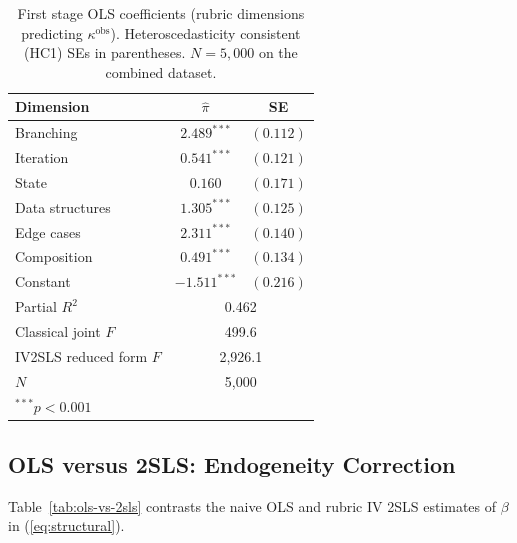 \documentclass{article}
\begin{document}
\begin{table}[h]
\centering
\caption{First stage OLS coefficients (rubric dimensions predicting $\kappa^{\text{obs}}$). Heteroscedasticity consistent (HC1) SEs in parentheses. $N=5{,}000$ on the combined dataset.}
\label{tab:stage1}
\begin{tabular}{@{}lcc@{}}
\toprule
Dimension & $\hat{\pi}$ & SE \\
\midrule
Branching        & $2.489^{***}$  & $(0.112)$ \\
Iteration        & $0.541^{***}$  & $(0.121)$ \\
State            & $0.160$        & $(0.171)$ \\
Data structures  & $1.305^{***}$  & $(0.125)$ \\
Edge cases       & $2.311^{***}$  & $(0.140)$ \\
Composition      & $0.491^{***}$  & $(0.134)$ \\
Constant         & $-1.511^{***}$ & $(0.216)$ \\
\midrule
Partial $R^2$                & \multicolumn{2}{c}{0.462} \\
Classical joint $F$          & \multicolumn{2}{c}{499.6} \\
IV2SLS reduced form $F$      & \multicolumn{2}{c}{2{,}926.1} \\
$N$                          & \multicolumn{2}{c}{5{,}000} \\
\bottomrule
\multicolumn{3}{l}{\footnotesize $^{***}p<0.001$}
\end{tabular}
\end{table}

\subsection{OLS versus 2SLS: Endogeneity Correction}

Table~\ref{tab:ols-vs-2sls} contrasts the naive OLS and rubric IV 2SLS estimates of $\beta$ in (\ref{eq:structural}).
\end{document}
